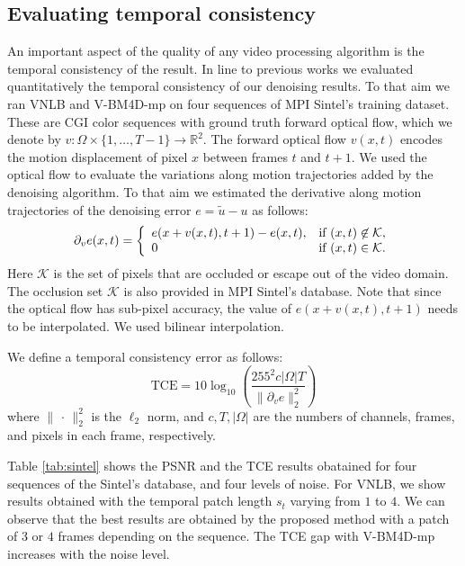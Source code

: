 \documentclass[10pt, a4paper]{article}
\newcommand{\pcomment}[1]{}
\begin{document}
\subsection{Evaluating temporal consistency}
\label{sse:temporal-consistency}

An important aspect of the quality of any video processing algorithm is the 
temporal consistency of the result. In line to previous works \cite{Liu2010, Sutour2014}
we evaluated quantitatively the temporal consistency of our denoising results.
To that aim we ran VNLB and V-BM4D-mp on four sequences of MPI Sintel's training
dataset. These are CGI color sequences with ground truth forward optical flow, which we
denote by $v:\Omega\times\{1,\dots,T-1\}\rightarrow \mathds R^2$. 
The forward optical flow $v(x,t)$ encodes the motion displacement of pixel $x$
between frames $t$ and $t +1$.
We used the optical flow to evaluate the variations along motion trajectories
added by the denoising algorithm. To that aim we estimated the derivative along
motion trajectories of the denoising error $e = \widetilde u - u$ as follows:
\[\partial_v e(x,t) =
\left\{
\begin{array}{l l}
	e(x + v(x,t), t+1) - e(x,t), & \text{if } (x,t)\not\in \mathcal{K},\\
	0 & \text{if } (x,t)\in \mathcal{K}.
\end{array}
\right.\]
Here $\mathcal K$ is the set of pixels that are occluded or escape out of the video
domain. The occlusion set $\mathcal K$ is also provided in MPI Sintel's database.
Note that since the optical flow has sub-pixel accuracy, the value of $e(x + v(x,t),t+1)$
needs to be interpolated. We used bilinear interpolation.

We define a temporal consistency error as follows:
\[\text{TCE} = 10 \log_{10}\left(\frac{255^2 c|\Omega|T}{\|\partial_v e\|_2^2}\right)\]
where $\|\,\cdot\,\|_2^2$ is the $\ell_2$ norm, and $c, T, |\Omega|$ are the numbers
of channels, frames, and pixels in each frame, respectively.

Table \ref{tab:sintel} shows the PSNR and the TCE results obatained for four sequences of the
Sintel's database, and four levels of noise. For VNLB, we show results obtained with 
the temporal patch length $s_t$ varying from $1$ to $4$. We can observe that the best results
are obtained by the proposed method with a patch of $3$ or $4$ frames depending
on the sequence. The TCE gap with V-BM4D-mp increases with the noise level. 
\pcomment{TODO: Comment on these results, but after the results have been
recomputed with the right parameters!}
\end{document}
